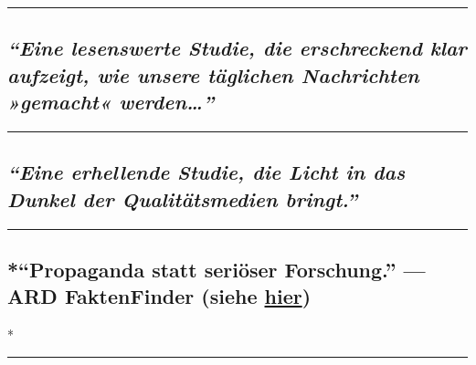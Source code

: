 \begin{center}\rule{0.5\linewidth}{\linethickness}\end{center}

\hypertarget{eine-lesenswerte-studie-die-erschreckend-klar-aufzeigt-wie-unsere-tuxe4glichen-nachrichten-gemacht-werden}{%
\subsection{\texorpdfstring{\emph{``Eine lesenswerte Studie, die
erschreckend klar aufzeigt, wie unsere täglichen Nachrichten »gemacht«
werden\ldots{}''}}{``Eine lesenswerte Studie, die erschreckend klar aufzeigt, wie unsere täglichen Nachrichten »gemacht« werden\ldots{}''}}\label{eine-lesenswerte-studie-die-erschreckend-klar-aufzeigt-wie-unsere-tuxe4glichen-nachrichten-gemacht-werden}}

\begin{center}\rule{0.5\linewidth}{\linethickness}\end{center}

\hypertarget{eine-erhellende-studie-die-licht-in-das-dunkel-der-qualituxe4tsmedien-bringt}{%
\subsection{\texorpdfstring{\emph{``Eine erhellende Studie, die Licht in
das Dunkel der Qualitätsmedien
bringt.''}}{``Eine erhellende Studie, die Licht in das Dunkel der Qualitätsmedien bringt.''}}\label{eine-erhellende-studie-die-licht-in-das-dunkel-der-qualituxe4tsmedien-bringt}}

\begin{center}\rule{0.5\linewidth}{\linethickness}\end{center}

\hypertarget{propaganda-statt-seriuxf6ser-forschung--ard-faktenfinder-siehe-hier}{%
\subsection{\texorpdfstring{*``Propaganda statt seriöser Forschung.''
--- ARD FaktenFinder (siehe
\href{https://swprs.org/medienspiegel/}{hier})}{*``Propaganda statt seriöser Forschung.'' --- ARD FaktenFinder (siehe hier)}}\label{propaganda-statt-seriuxf6ser-forschung--ard-faktenfinder-siehe-hier}}

*

\begin{center}\rule{0.5\linewidth}{\linethickness}\end{center}

